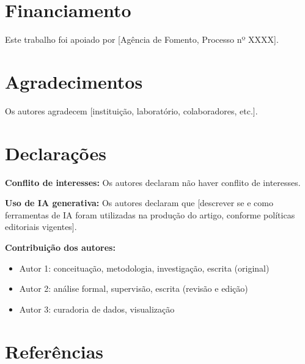\documentclass[preprint,12pt,review]{elsarticle}
\begin{document}
\section*{Financiamento}
Este trabalho foi apoiado por [Agência de Fomento, Processo nº XXXX].

\section*{Agradecimentos}
Os autores agradecem [instituição, laboratório, colaboradores, etc.].

\section*{Declarações}
\textbf{Conflito de interesses:} Os autores declaram não haver conflito de
interesses.

\textbf{Uso de IA generativa:} Os autores declaram que [descrever se e como
ferramentas de IA foram utilizadas na produção do artigo, conforme políticas
editoriais vigentes].

\textbf{Contribuição dos autores:}
\begin{itemize}
  \item Autor 1: conceituação, metodologia, investigação, escrita (original)
  \item Autor 2: análise formal, supervisão, escrita (revisão e edição)
  \item Autor 3: curadoria de dados, visualização
\end{itemize}

\section*{Referências}

%



\end{document}
